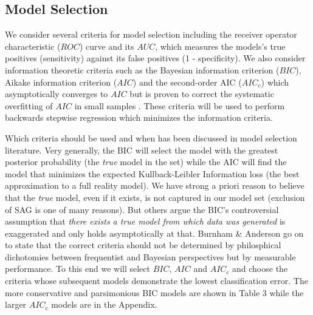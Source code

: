 \documentclass[jou,apacite]{apa6}
\begin{document}
\subsection{Model Selection}
We consider several criteria for model selection including the receiver operator characteristic ($ROC$) curve and its $AUC$, which measures the models's true positives (sensitivity) against its false positives (1 - specificity). We also consider information theoretic criteria such as the Bayesian information criterion ($BIC$), Aikake information criterion ($AIC$) and the second-order AIC ($AIC_c$) which asymptotically converges to $AIC$ but is proven to correct the systematic overfitting of $AIC$ \cite{raftery} in small samples \cite{Burnham04}. These criteria will be used  to perform backwards stepwise regression which minimizes the information criteria.

Which criteria should be used and when has been discussed in model selection literature. Very generally, the BIC will select the model with the greatest posterior probability (the \emph{true} model in the set) while the AIC will find the model that minimizes the expected Kullback-Leibler Information loss (the best approximation to a full reality model). We have strong a priori reason to believe that the \emph{true} model, even if it exists, is not captured in our model set (exclusion of SAG is one of many reasons). But others \cite{Burnham04} argue the BIC's controversial assumption that \emph{there exists a true model from which data was generated} is exaggerated and only holds asymptotically at that. Burnham \& Anderson go on to state that the correct criteria should not be determined by philosphical dichotomies between frequentist and Bayesian perspectives but by measurable performance. To this end we will select $BIC$, $AIC$ and $AIC_c$ and choose the criteria whose subsequent models demonstrate the lowest classification error. The more conservative and parsimonious BIC models are shown in Table 3 while the larger $AIC_c$ models are in the Appendix.
\end{document}
